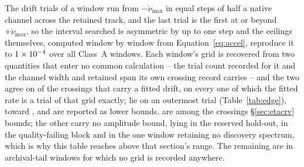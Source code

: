 The drift trials of a window run from $-\dot\nu_{\max}$ in equal steps of
half a native channel across the retained track, and the last trial is the
first at or beyond $+\dot\nu_{\max}$, so the interval searched is asymmetric
by up to one step and the ceilings themselves, computed window by window from
Equation~\ref{eq:accel}, reproduce it to $1\times10^{-4}$ over all
\DriftRelNWin{} Class~A windows. Each window's grid is recovered from two
quantities that enter no common calculation -- the trial count recorded for
it and the channel width and retained span its own crossing record carries --
and the two agree on \EgNGrid{} of the \EgNDrift{} crossings that carry a
fitted drift, on every one of which the fitted rate is a trial of that grid
exactly; \EgNEdge{} lie on an outermost trial (Table~\ref{tab:edge}), toward
\EgEdgeStars, and are reported as lower bounds. \EgNEdgeExcl{} are among the
\RcNExcl{} crossings \S\ref{sec:etacrv} bounds; the other \EgNEdgeOut{} carry
no amplitude bound, lying in the reserved hold-out, in the quality-failing
block and in the one window retaining no discovery spectrum, which is why
this table reaches above that section's range. The remaining
\EgNNoGrid{} are in archival-tail windows for which no grid is recorded
anywhere.

\begin{table}
\caption{The crossings whose fitted drift lies on an outermost trial of
their window's own grid, with that grid. Rates are in the observatory
frame.}
\label{tab:edge}
\footnotesize

\end{table}
